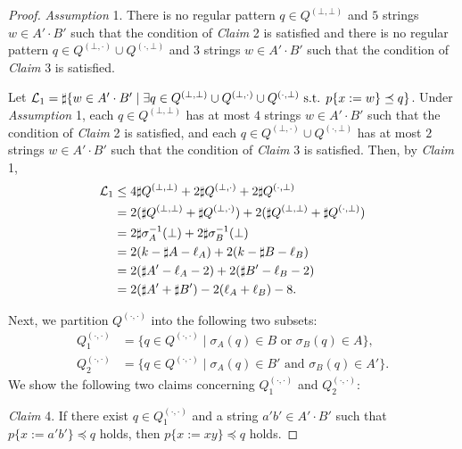 \begin{proof}
\smallskip

\noindent
\textit{Assumption} 1.
There is no regular pattern $q \in Q^{(\bot,\bot)}$ and $5$ strings $w \in A'\cdot B'$ such that the condition of \textit{Claim} 2 is satisfied and there is no regular pattern $q \in Q^{(\bot,\cdot)} \cup Q^{(\cdot,\bot)}$ and $3$ strings $w \in A'\cdot B'$ such that the condition of \textit{Claim} 3 is satisfied.

\smallskip

\noindent
Let ${\cal L}_{1} = \sharp\{w \in A'\cdot B' \mid \exists q \in Q^{(\bot,\bot)} \cup Q^{(\bot,\cdot)} \cup Q^{(\cdot,\bot)} \mbox{ s.t. } p\{x:=w\} \preceq q\}$.
Under \textit{Assumption} 1, each $q\in Q^{(\bot,\bot)}$ has at most $4$ strings $w \in A'\cdot B'$ such that the condition of \textit{Claim} 2 is satisfied, and each $q \in Q^{(\bot,\cdot)} \cup Q^{(\cdot,\bot)}$ has at most $2$ strings $w \in A'\cdot B'$ such that the condition of \textit{Claim} 3 is satisfied.
Then, by \textit{Claim} 1,
\begin{align*}
  {\cal L}_{1} &\leq 4\sharp Q^{(\bot,\bot)} + 2\sharp Q^{(\bot,\cdot)} + 2\sharp Q^{(\cdot,\bot)}\\
  & = 2(\sharp Q^{(\bot,\bot)} + \sharp Q^{(\bot,\cdot)}) + 2(\sharp Q^{(\bot,\bot)} + \sharp Q^{(\cdot,\bot)})\\
  & = 2\sharp \sigma_{A}^{-1}(\bot) + 2\sharp \sigma_{B}^{-1}(\bot)\\
  & = 2(k - \sharp A - \ell_{A}) + 2(k - \sharp B - \ell_{B})\\
  & = 2(\sharp A' - \ell_{A} - 2) + 2(\sharp B' - \ell_{B} - 2)\\
  & = 2(\sharp A' + \sharp B') - 2(\ell_{A} + \ell_{B}) - 8.
\end{align*}

Next, we partition $Q^{(\cdot,\cdot)}$ into the following two subsets:
\begin{align*}
  Q_{1}^{(\cdot,\cdot)} & = \{q \in Q^{(\cdot,\cdot)} \mid \sigma_{A}(q) \in B \mbox{ or } \sigma_{B}(q) \in A\},\\
  Q_{2}^{(\cdot,\cdot)} & = \{q \in Q^{(\cdot,\cdot)} \mid \sigma_{A}(q) \in B' \mbox{ and } \sigma_{B}(q) \in A'\}.
\end{align*}
We show the {\color{red}following} two claims {\color{red}concerning} $Q_{1}^{(\cdot,\cdot)}$ and $Q_{2}^{(\cdot,\cdot)}$:

\smallskip

\noindent
\textit{Claim} 4.
If there exist $q \in Q_{1}^{(\cdot,\cdot)}$ and a string $a'b' \in A'\cdot B'$ such that $p\{x:=a'b'\} \preceq q$ holds, then $p\{x:=xy\} \preceq q$ holds.


\end{proof}
